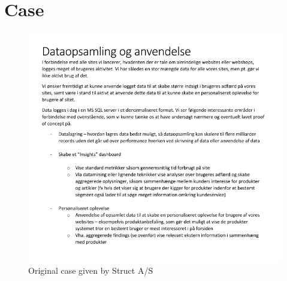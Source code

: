 \chapter{Case}
\label{Case}
\begin{figure}[H]
	\includegraphics[scale=0.9]{Figures/Case}
	\caption{Original case given by Struct A/S}
\end{figure}